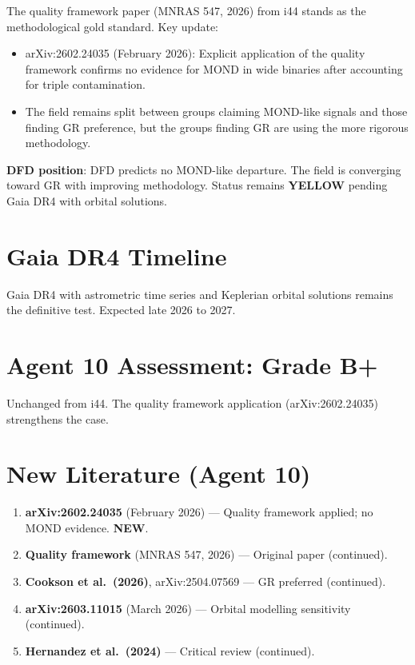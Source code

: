 \documentclass[11pt,a4paper]{article}
\newcommand{\YELLOW}{\textcolor{dfdyellow}{\textbf{YELLOW}}}
\newcommand{\NEW}{\textcolor{dfdblue}{\textbf{NEW}}}
\begin{document}
\begin{tcolorbox}[colback=green!5!white, colframe=green!60!black,
  title={Field Converging Toward GR --- No MOND Evidence After Proper Filtering}]

The quality framework paper (MNRAS 547, 2026) from i44 stands as the methodological gold standard. Key update:

\begin{itemize}
\item arXiv:2602.24035 (February 2026): Explicit application of the quality framework confirms no evidence for MOND in wide binaries after accounting for triple contamination.
\item The field remains split between groups claiming MOND-like signals and those finding GR preference, but the groups finding GR are using the more rigorous methodology.
\end{itemize}

\textbf{DFD position}: DFD predicts no MOND-like departure. The field is converging toward GR with improving methodology. Status remains \YELLOW{} pending Gaia DR4 with orbital solutions.
\end{tcolorbox}

\section{Gaia DR4 Timeline}

Gaia DR4 with astrometric time series and Keplerian orbital solutions remains the definitive test. Expected late 2026 to 2027.

\section{Agent 10 Assessment: Grade B+}

Unchanged from i44. The quality framework application (arXiv:2602.24035) strengthens the case.

\section{New Literature (Agent 10)}

\begin{enumerate}
\item \textbf{arXiv:2602.24035} (February 2026) --- Quality framework applied; no MOND evidence. \NEW.
\item \textbf{Quality framework} (MNRAS 547, 2026) --- Original paper (continued).
\item \textbf{Cookson et al.\ (2026)}, arXiv:2504.07569 --- GR preferred (continued).
\item \textbf{arXiv:2603.11015} (March 2026) --- Orbital modelling sensitivity (continued).
\item \textbf{Hernandez et al.\ (2024)} --- Critical review (continued).
\end{enumerate}
\end{document}
